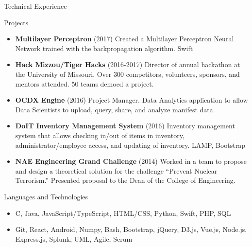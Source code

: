 \documentclass[]{mcdowellcv}
\begin{document}
    \begin{cvsection}{Technical Experience}
        \begin{cvsubsection}{Projects}{}{}
            \begin{itemize}
                \item \textbf{Multilayer Perceptron} (2017) Created a Multilayer Perceptron Neural Network trained with the backpropagation algorithm. Swift
                \item \textbf{Hack Mizzou/Tiger Hacks} (2016-2017) Director of annual hackathon at the University of Missouri. Over 300 competitors, volunteers, sponsors, and mentors attended. 50 teams demoed a project.
                \item \textbf{OCDX Engine} (2016) Project Manager. Data Analytics application to allow Data Scientists to upload, query, share, and analyze manifest data.
                \item \textbf{DoIT Inventory Management System} (2016) Inventory management system that allows checking in/out of items in inventory, administrator/employee access, and updating of inventory. LAMP, Bootstrap
                \item \textbf{NAE Engineering Grand Challenge} (2014) Worked in a team to propose and design a theoretical solution for the challenge “Prevent Nuclear Terrorism.” Presented proposal to the Dean of the College of Engineering.
            \end{itemize}
        \end{cvsubsection}

        \begin{cvsubsection}{Languages and Technologies}{}{}
            \begin{itemize}
                \item C, Java, JavaScript/TypeScript, HTML/CSS, Python, Swift, PHP, SQL
                \item Git, React, Android, Numpy, Bash, Bootstrap, jQuery, D3.js, Vue.js, Node.js, Express.js, Splunk, UML, Agile, Scrum
            \end{itemize}
        \end{cvsubsection}
    \end{cvsection}
    
\end{document}
